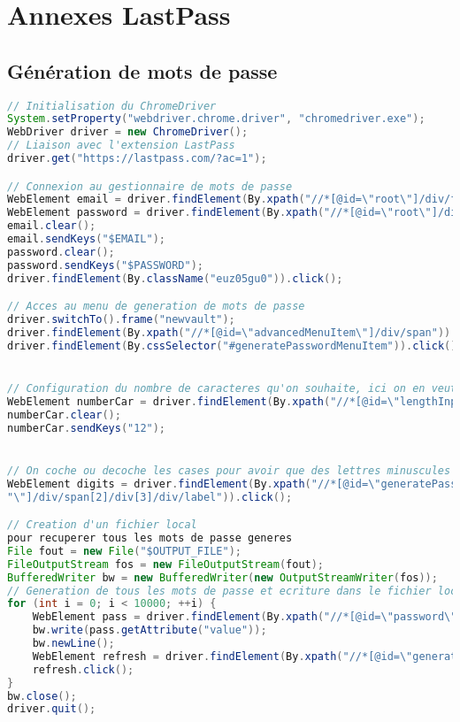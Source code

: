 
\chapter{Annexes LastPass}
\section{Génération de mots de passe}

\begin{lstlisting}[language=java,label=script_gen_last, caption=Script pour la génération de mots de passe LastPass]
// Initialisation du ChromeDriver
System.setProperty("webdriver.chrome.driver", "chromedriver.exe");
WebDriver driver = new ChromeDriver();
// Liaison avec l'extension LastPass
driver.get("https://lastpass.com/?ac=1");

// Connexion au gestionnaire de mots de passe
WebElement email = driver.findElement(By.xpath("//*[@id=\"root\"]/div/form/div[1]/div/div/input"));
WebElement password = driver.findElement(By.xpath("//*[@id=\"root\"]/div/form/div[2]/div/input"));
email.clear();
email.sendKeys("$EMAIL");
password.clear();
password.sendKeys("$PASSWORD");
driver.findElement(By.className("euz05gu0")).click();

// Acces au menu de generation de mots de passe
driver.switchTo().frame("newvault");
driver.findElement(By.xpath("//*[@id=\"advancedMenuItem\"]/div/span")).click();
driver.findElement(By.cssSelector("#generatePasswordMenuItem")).click();


// Configuration du nombre de caracteres qu'on souhaite, ici on en veut 12
WebElement numberCar = driver.findElement(By.xpath("//*[@id=\"lengthInput\"]"));
numberCar.clear();
numberCar.sendKeys("12");


// On coche ou decoche les cases pour avoir que des lettres minuscules et majuscules
WebElement digits = driver.findElement(By.xpath("//*[@id=\"generatePasswordDialogDropdownAdvancedOptions" +
"\"]/div/span[2]/div[3]/div/label")).click();

// Creation d'un fichier local
pour recuperer tous les mots de passe generes
File fout = new File("$OUTPUT_FILE");
FileOutputStream fos = new FileOutputStream(fout);
BufferedWriter bw = new BufferedWriter(new OutputStreamWriter(fos));
// Generation de tous les mots de passe et ecriture dans le fichier local ligne par ligne
for (int i = 0; i < 10000; ++i) {
	WebElement pass = driver.findElement(By.xpath("//*[@id=\"password\"]"));
	bw.write(pass.getAttribute("value"));
	bw.newLine();
	WebElement refresh = driver.findElement(By.xpath("//*[@id=\"generateBtn\"]"));
	refresh.click();
}
bw.close();
driver.quit();
\end{lstlisting}

